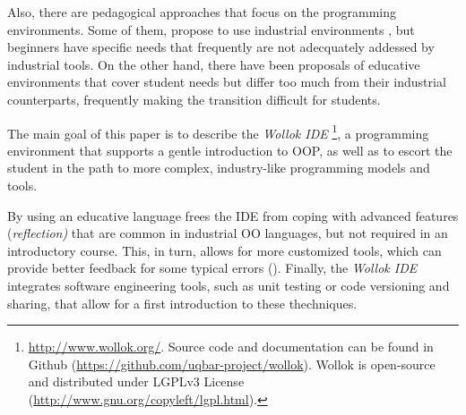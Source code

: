 Also, there are pedagogical approaches that focus on the programming environments.
Some of them, propose to use industrial environments 
\cite{broy_outside-method_2003,ducasse2006squeak,Unga87a,ingalls_back_1997},
but beginners have specific needs 
that frequently are not adecquately addessed by industrial tools.
On the other hand, there have been proposals of educative environments
\cite{griggio_programming_2011,malan_scratch_2007,bennedsen_bluej_2010}
that cover student needs but differ too much from their industrial counterparts,
frequently making the transition difficult for students.

\smallskip

The main goal of this paper is to describe the \emph{Wollok IDE}%
\footnote{
	\url{http://www.wollok.org/}. 
	Source code and documentation can be found in Github 
	(\url{https://github.com/uqbar-project/wollok}).
	Wollok is open-source and distributed under LGPLv3 License 
	(\url{http://www.gnu.org/copyleft/lgpl.html}).},
a programming environment that supports a gentle introduction to OOP,
as well as to escort the student in the path to more complex, industry-like 
programming models and tools.

By using an educative language frees the IDE from coping 
with advanced features (\eg \emph{reflection)} that are common in industrial OO languages, 
but not required in an introductory course.
This, in turn, allows for more customized tools, 
\eg which can provide better feedback for some typical errors (\cf {}).
Finally, the \emph{Wollok IDE} integrates software engineering tools,
such as unit testing or code versioning and sharing,
that allow for a first introduction to these thechniques.



